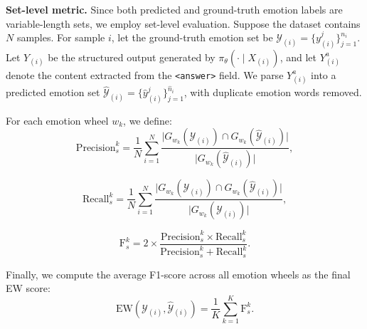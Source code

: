 \documentclass{article}
\theoremstyle{plain}
\theoremstyle{definition}
\theoremstyle{remark}
\begin{document}
\noindent\textbf{Set-level metric.}
Since both predicted and ground-truth emotion labels are variable-length sets, we employ set-level evaluation.
Suppose the dataset contains $N$ samples.
For sample $i$, let the ground-truth emotion set be $\mathcal{Y}_{(i)} = \{y_{(i)}^j\}_{j=1}^{n_i}$.
Let $Y_{(i)}$ be the structured output generated by $\pi_\theta(\cdot\mid X_{(i)})$, and let $Y_{(i)}^{a}$ denote the content extracted from the \texttt{<answer>} field.
We parse $Y_{(i)}^{a}$ into a predicted emotion set $\hat{\mathcal{Y}}_{(i)} = \{\hat{y}_{(i)}^j\}_{j=1}^{\hat{n}_i}$, with duplicate emotion words removed.

For each emotion wheel $w_k$, we define:
\begin{equation}
\mathrm{Precision}_s^{k} =
\frac{1}{N}\sum_{i=1}^{N}
\frac{\bigl|G_{w_k}(\mathcal{Y}_{(i)}) \cap G_{w_k}(\hat{\mathcal{Y}}_{(i)})\bigr|}
{\bigl|G_{w_k}(\hat{\mathcal{Y}}_{(i)})\bigr|},
\end{equation}

\begin{equation}
\mathrm{Recall}_s^{k} =
\frac{1}{N}\sum_{i=1}^{N}
\frac{\bigl|G_{w_k}(\mathcal{Y}_{(i)}) \cap G_{w_k}(\hat{\mathcal{Y}}_{(i)})\bigr|}
{\bigl|G_{w_k}(\mathcal{Y}_{(i)})\bigr|},
\end{equation}

\begin{equation}
\mathrm{F}_s^{k} =
2 \times
\frac{\mathrm{Precision}_s^{k} \times \mathrm{Recall}_s^{k}}
{\mathrm{Precision}_s^{k} + \mathrm{Recall}_s^{k}}.
\end{equation}


Finally, we compute the average F1-score across all emotion wheels as the final EW score:
\begin{equation}
\mathrm{EW}(\mathcal{Y}_{(i)}, \hat{\mathcal{Y}}_{(i)}) =
\frac{1}{K}\sum_{k=1}^{K} \mathrm{F}_s^{k}.
\end{equation}
\end{document}
